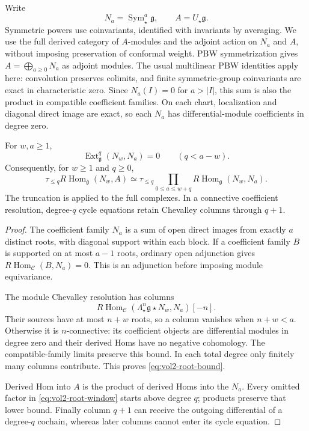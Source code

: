 Write
\[
 N_a=\operatorname{Sym}^a_\star\mathfrak g,\qquad
 A=U_\star\mathfrak g.
\]
Symmetric powers use coinvariants, identified with invariants by
averaging. We use the full derived category of $A$-modules and
the adjoint action on $N_a$ and $A$, without imposing preservation
of conformal weight. PBW symmetrization gives
$A=\bigoplus_{a\geq0}N_a$ as adjoint modules. The usual multilinear
PBW identities apply here: convolution preserves colimits, and
finite symmetric-group coinvariants are exact in characteristic
zero. Since $N_a(I)=0$ for $a>|I|$, this sum is also the product
in compatible coefficient families. On each chart, localization
and diagonal direct image are exact, so each $N_a$ has
differential-module coefficients in degree zero.

\begin{theorem}
\label{thm:vol2-root-bound}
For $w,a\geq1$,
\begin{equation}\label{eq:vol2-root-bound}
 \operatorname{Ext}^q_{\mathfrak g}(N_w,N_a)=0\qquad(q<a-w).
\end{equation}
Consequently, for $w\geq1$ and $q\geq0$,
\begin{equation}\label{eq:vol2-root-window}
 \tau_{\leq q}R\operatorname{Hom}_{\mathfrak g}(N_w,A)
 \simeq\tau_{\leq q}\prod_{0\leq a\leq w+q}
              R\operatorname{Hom}_{\mathfrak g}(N_w,N_a).
\end{equation}
The truncation is applied to the full complexes. In a connective
coefficient resolution, degree-$q$ cycle equations retain Chevalley
columns through $q+1$.
\end{theorem}
\begin{proof}
The coefficient family $N_a$ is a sum of open direct images from
exactly $a$ distinct roots, with diagonal support within each
block. If a coefficient family $B$ is supported on at most
$a-1$ roots, ordinary open adjunction gives
$R\operatorname{Hom}_{\mathcal C}(B,N_a)=0$.
This is an adjunction before imposing module equivariance.

The module Chevalley resolution has columns
\[
 R\operatorname{Hom}_{\mathcal C}
       (\Lambda^n_\star\mathfrak g\star N_w,N_a)[-n].
\]
Their sources have at most $n+w$ roots, so a column vanishes
when $n+w<a$. Otherwise it is $n$-connective: its coefficient
objects are differential modules in degree zero and their
derived Homs have no negative cohomology. The compatible-family
limits preserve this bound. In each total degree only finitely
many columns contribute. This proves \eqref{eq:vol2-root-bound}.

Derived Hom into $A$ is the product of derived Homs into the
$N_a$. Every omitted factor in \eqref{eq:vol2-root-window} starts
above degree $q$; products preserve that lower bound. Finally
column $q+1$ can receive the outgoing differential of a
degree-$q$ cochain, whereas later columns cannot enter its
cycle equation.
\end{proof}

